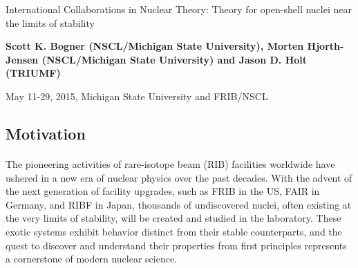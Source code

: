 \documentclass[%
twoside,                 %
final,                   %
10pt]{article}
\begin{document}




\thispagestyle{empty}

\begin{center}
{\LARGE\bf
\begin{spacing}{1.25}
International Collaborations in Nuclear Theory: Theory for open-shell nuclei near the limits of stability
\end{spacing}
}
\end{center}


\begin{center}
{\bf Scott K. Bogner (NSCL/Michigan State University), Morten Hjorth-Jensen (NSCL/Michigan State University) and Jason D. Holt (TRIUMF)${}^{}$} \\ [0mm]
\end{center}

    \begin{center}
\end{center}
    


\begin{center} %
May 11-29, 2015, Michigan State University and FRIB/NSCL
\end{center}

\vspace{1cm}


\subsection*{Motivation}


\paragraph{}


The pioneering activities of rare-isotope beam (RIB) facilities worldwide have 
ushered in a new era of nuclear physics over the past decades. With the advent of 
the next generation of facility upgrades, such as FRIB in the US, FAIR in Germany, 
and RIBF in Japan, thousands of undiscovered nuclei, often existing at the very 
limits of stability, will be created and studied in the laboratory. These exotic 
systems exhibit behavior distinct from their stable counterparts, and the quest to 
discover and understand their properties from first principles represents a 
cornerstone of modern nuclear science.
\end{document}
